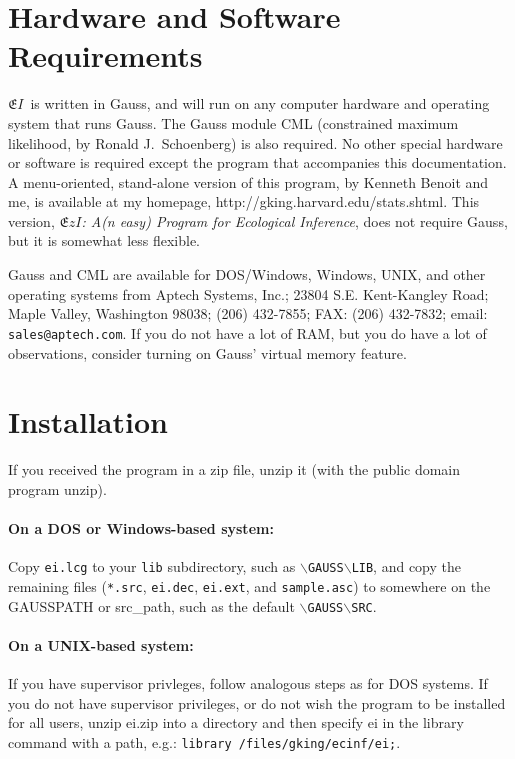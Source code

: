 \documentclass[11pt,titlepage]{article}
\newcommand{\EI}{\ensuremath{{\mathfrak EI}}}
\newcommand{\EzI}{\ensuremath{{\mathfrak EzI}}}
\newcommand{\hlink}{\htmladdnormallink}
\begin{document}
\section{Hardware and Software Requirements}

\EI\ is written in Gauss, and will run on any computer hardware and
operating system that runs Gauss.  The Gauss module CML (constrained
maximum likelihood, by Ronald J.\ Schoenberg) is also required.  No
other special hardware or software is required except the program that
accompanies this documentation.  A menu-oriented, stand-alone version
of this program, by Kenneth Benoit and me, is available at my
homepage, \hlink{\url{http://GKing.Harvard.Edu/stats.shtml}}
{http://gking.harvard.edu/stats.shtml}.  This version, \emph{\EzI: A(n
  easy) Program for Ecological Inference}, does not require Gauss, but
it is somewhat less flexible.

Gauss and CML are available for DOS/Windows, Windows, UNIX, and other
operating systems from Aptech Systems, Inc.; 23804 S.E. Kent-Kangley
Road; Maple Valley, Washington 98038; (206) 432-7855; FAX: (206)
432-7832; email: \texttt{sales@aptech.com}.  If you do not have a lot
of RAM, but you do have a lot of observations, consider turning on
Gauss' virtual memory feature.

\section{Installation}

If you received the program in a zip file, unzip it (with the public
domain program unzip).

\paragraph{On a DOS or Windows-based system:} Copy \texttt{ei.lcg} to
your \texttt{lib} subdirectory, such as
$\backslash$\texttt{GAUSS}$\backslash$\texttt{LIB}, and copy the
remaining files (\texttt{*.src}, \texttt{ei.dec}, \texttt{ei.ext}, and
\texttt{sample.asc}) to somewhere on the GAUSSPATH or src\_path, such
as the default $\backslash$\texttt{GAUSS}$\backslash$\texttt{SRC}.

\paragraph{On a UNIX-based system:}
If you have supervisor privleges, follow analogous steps as for DOS
systems.  If you do not have supervisor privileges, or do not wish the
program to be installed for all users, unzip ei.zip into a directory
and then specify ei in the library command with a path, e.g.:
\texttt{library /files/gking/ecinf/ei;}.
\end{document}

